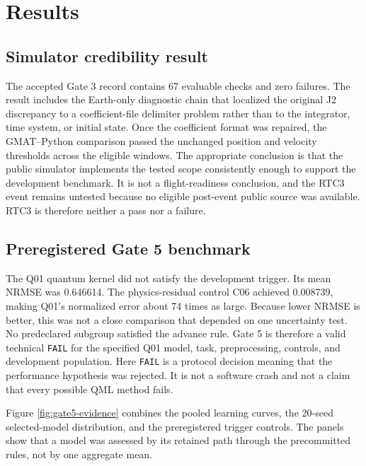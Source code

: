 \section{Results}
\label{sec:results}

\subsection{Simulator credibility result}

The accepted Gate 3 record contains 67 evaluable checks and zero failures.
The result includes the Earth-only diagnostic chain that localized the original
J2 discrepancy to a coefficient-file delimiter problem rather than to the
integrator, time system, or initial state. Once the coefficient format was
repaired, the GMAT--Python comparison passed the unchanged position and
velocity thresholds across the eligible windows. The appropriate conclusion is
that the public simulator implements the tested scope consistently enough to
support the development benchmark. It is not a flight-readiness conclusion,
and the RTC3 event remains untested because no eligible post-event public source
was available. RTC3 is therefore neither a pass nor a failure.

\subsection{Preregistered Gate 5 benchmark}

The Q01 quantum kernel did not satisfy the development trigger. Its mean NRMSE
was 0.646614. The physics-residual control C06 achieved 0.008739, making Q01's
normalized error about 74 times as large. Because lower NRMSE is
better, this was not a close comparison that depended on one uncertainty test.
No predeclared subgroup satisfied the advance rule. Gate 5 is therefore a valid
technical \texttt{FAIL} for the specified Q01 model, task, preprocessing,
controls, and development population. Here \texttt{FAIL} is a protocol decision
meaning that the performance hypothesis was rejected. It is not a software
crash and not a claim that every possible QML method fails.

Figure \ref{fig:gate5-evidence} combines the pooled learning curves, the
20-seed selected-model distribution, and the preregistered trigger controls.
The panels show that a model was assessed by its retained path through the
precommitted rules, not by one aggregate mean.

